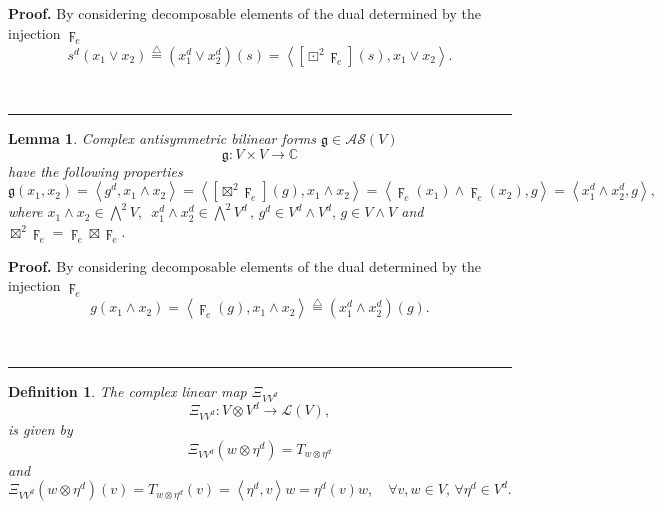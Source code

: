 \documentclass[aps,preprint]{revtex4}%
\newtheorem{definition}[theorem]{Definition}
\newtheorem{lemma}[theorem]{Lemma}
\newenvironment{proof}[1][Proof]{\noindent\textbf{#1.} }{\ \rule{0.5em}{0.5em}}
\begin{document}
\begin{proof}
By considering decomposable elements of the dual determined by the injection
$\digamma_{e}\quad$
\begin{equation}
s^{d}\left(  x_{1}\vee x_{2}\right)  \overset{\bigtriangleup}{=}\left(
x_{1}^{d}\vee x_{2}^{d}\right)  \left(  s\right)  =\left\langle \left[
\boxdot^{2}\digamma_{e}\right]  \left(  s\right)  ,x_{1}\vee x_{2}%
\right\rangle .
\end{equation}

\end{proof}

\begin{lemma}
Complex antisymmetric bilinear forms $\mathfrak{g}\in\mathcal{AS}\left(
V\right)  $%
\begin{equation}
\mathfrak{g}:V\times V\rightarrow\mathbb{C}%
\end{equation}
have the following properties
\begin{equation}
\mathfrak{g}\left(  x_{1},x_{2}\right)  =\left\langle g^{d},x_{1}\wedge
x_{2}\right\rangle =\left\langle \left[  \boxtimes^{2}\digamma_{e}\right]
\left(  g\right)  ,x_{1}\wedge x_{2}\right\rangle =\left\langle \digamma
_{e}\left(  x_{1}\right)  \wedge\digamma_{e}\left(  x_{2}\right)
,g\right\rangle =\left\langle x_{1}^{d}\wedge x_{2}^{d},g\right\rangle ,
\end{equation}
where $x_{1}\wedge x_{2}\in\bigwedge\nolimits^{2}V,$\thinspace\ $x_{1}%
^{d}\wedge x_{2}^{d}\in\bigwedge\nolimits^{2}V^{d}\,,\,g^{d}\in V^{d}\wedge
V^{d},\,g\in V\wedge V$ and $\boxtimes^{2}\digamma_{e}=\digamma_{e}%
\boxtimes\digamma_{e}.$
\end{lemma}

\begin{proof}
By considering decomposable elements of the dual determined by the injection
$\digamma_{e}\quad$
\begin{equation}
g\left(  x_{1}\wedge x_{2}\right)  =\left\langle \digamma_{e}\left(  g\right)
,x_{1}\wedge x_{2}\right\rangle \overset{\bigtriangleup}{=}\left(  x_{1}%
^{d}\wedge x_{2}^{d}\right)  \left(  g\right)  .
\end{equation}

\end{proof}

\begin{definition}
The \emph{complex linear }map $\Xi_{VV^{d}}$
\begin{equation}
\Xi_{VV^{d}}:V\otimes V^{d}\rightarrow\mathcal{L}\left(  V\right)  ,
\end{equation}
is given by
\begin{equation}
\Xi_{VV^{d}}\left(  w\otimes\eta^{d}\right)  =T_{w\otimes\eta^{d}}%
\end{equation}
and
\begin{equation}
\Xi_{VV^{d}}\left(  w\otimes\eta^{d}\right)  \left(  v\right)  =T_{w\otimes
\eta^{d}}\left(  v\right)  =\left\langle \eta^{d},v\right\rangle w=\eta
^{d}\left(  v\right)  w,\quad\forall v,w\in V,\,\forall\eta^{d}\in V^{d}.
\end{equation}

\end{definition}
\end{document}

